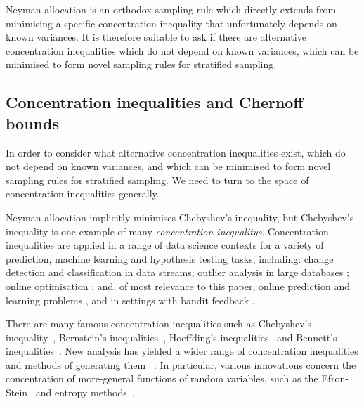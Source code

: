 Neyman allocation is an orthodox sampling rule which directly extends from minimising a specific concentration inequality that unfortunately depends on known variances.
It is therefore suitable to ask if there are alternative concentration inequalities which do not depend on known variances, which can be minimised to form novel sampling rules for stratified sampling.




\subsection{Concentration inequalities and Chernoff bounds}

In order to consider what alternative concentration inequalities exist, which do not depend on known variances, and which can be minimised to form novel sampling rules for stratified sampling.
We need to turn to the space of concentration inequalities generally. 

Neyman allocation implicitly minimises Chebyshev's inequality, but Chebyshev's inequality is one example of many \textit{concentration inequalitys}.
Concentration inequalities are applied in a range of data science contexts for a variety of prediction, machine learning and hypothesis testing tasks, including:
change detection \cite{KiferShaiGehrke2004,8000571} 
and classification \cite{Zia-UrRehman2012} in data streams;
outlier analysis in large databases \cite{Aggarwal2015};
online optimisation \cite{FlaxmanKalaiMcMahan2005,AgarwalDekelXiao2010}; and, of most relevance to this paper, 
online prediction and learning problems \cite{%
Mnih:2008:EBS:1390156.1390241,DBLP:conf/aaai/ThomasTG15,Maurer50empiricalbernstein},
and in settings with bandit feedback \cite{AuerCesa-BianchiEtal_SIAM2003,AudibertBubeck_COLT2009,Tran-ThanhChapmanRJ_AAAI2009}.

There are many famous concentration inequalities such as Chebyshev's inequality~\cite{Chebyshev1}, Bernstein's inequalities~\cite{Burnstein1}, 
Hoeffding's inequalities~\cite{hoeffding1} and Bennett's inequalities~\cite{10.2307/2282438}.
New analysis has yielded a wider range of concentration inequalities and methods of generating them ~\cite{MR3363542,Boucheron2004}. 
In particular, various innovations concern the concentration of more-general functions of random variables, such as 
the Efron-Stein~\cite{efron1981} and 
entropy methods~\cite{Boucheron_concentrationinequalities}.%

